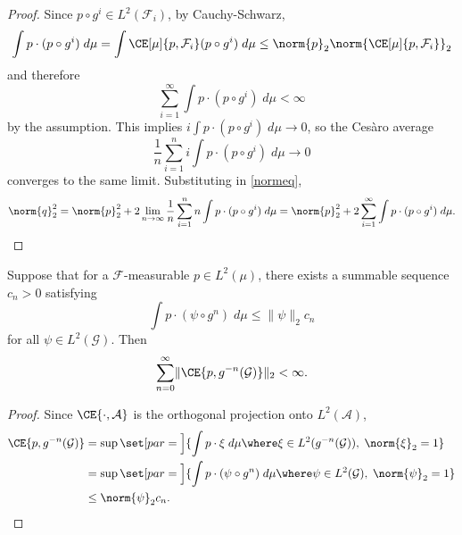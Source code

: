 \documentclass[../main]{subfiles}
\begin{document}
\begin{proof}
  Since \(p \circ g^i \in L^2(\mathcal{F}_i)\), by Cauchy-Schwarz,
  \begin{equation*}
    \int p \cdot (p \circ g^{i}) \;d\mu = 
    \int \CE[\mu]{p,\mathcal{F}_i} (p \circ g^{i}) \;d\mu
    \le \norm{p}_2 \norm{\CE[\mu]{p,\mathcal{F}_i}}_2
  \end{equation*}
  and therefore
  \begin{equation*}
    \sum_{i = 1}^{\infty} \int p \cdot (p \circ g^{i}) \;d\mu < \infty
  \end{equation*}
  by the assumption. This implies \(i \int p \cdot (p \circ g^{i}) \;d\mu \to 0\), so the Cesàro average
  \begin{equation*}
    \frac{1}{n}\sum_{i = 1}^{n}i \int p\cdot(p\circ g^{i}) \;d\mu
    \to 0
  \end{equation*}
  converges to the same limit. Substituting in \cref{normeq},
  \begin{equation*}
    \norm{q}_2^2 = \norm{p}_2^2 + 2\lim_{n \to \infty} \frac{1}{n} \sum_{i = 1}^{n} n \int p\cdot(p\circ g^{i}) \;d\mu
    = \norm{p}_2^2 + 2\sum_{i = 1}^{\infty}\int p\cdot(p\circ g^{i}) \;d\mu.
  \end{equation*}
\end{proof}

\begin{lemma}\label{cor:decay-implies-summable}
  Suppose that for a \(\mathcal{F}\)-measurable \(p \in L^{2}(\mu)\), there exists a summable sequence \(c_n > 0\) satisfying
  \begin{equation*}
    \int p \cdot (\psi \circ g^n) \;d\mu \leq \lVert \psi \rVert_2c_n
  \end{equation*}
  for all \(\psi \in L^2(\mathcal{G})\). Then
  \begin{equation*}
    \sum_{n = 0}^{\infty} \lVert \CE{p, g^{-n}(\mathcal{G})} \rVert_2 < \infty.
  \end{equation*}
\end{lemma}

\begin{proof}
  Since \(\CE{\cdot, \mathcal{A}}\) is the orthogonal projection onto \(L^2(\mathcal{A})\),
  \begin{align*}
    \CE{p, g^{-n}(\mathcal{G})}
    &= \sup \set[par = \Big]{\int p \cdot \xi \;d\mu \where \xi \in L^2(g^{-n}(\mathcal{G})),\;\norm{\xi}_2 = 1}\\
    &= \sup \set[par = \Big]{\int p \cdot (\psi \circ g^n) \;d\mu \where \psi \in L^2(\mathcal{G}),\;\norm{\psi}_2 = 1}\\
    &\le \norm{\psi}_2 c_n.
  \end{align*}
\end{proof}
\end{document}
